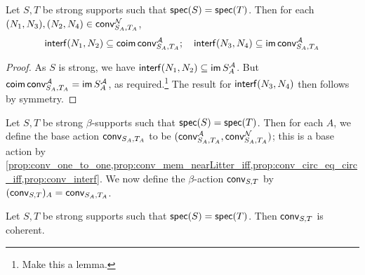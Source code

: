 \begin{proposition}
  \label{prop:conv_interf}
  Let \( S, T \) be strong supports such that \( \operatorname{\mathsf{spec}}(S) = \operatorname{\mathsf{spec}}(T) \).
  Then for each \( (N_1, N_3), (N_2, N_4) \in \operatorname{\mathsf{conv}}_{S_A, T_A}^{\mathcal N} \),
  \[ \operatorname{\mathsf{interf}}(N_1, N_2) \subseteq \operatorname{\mathsf{coim}} \operatorname{\mathsf{conv}}_{S_A, T_A}^{\mathcal A};\quad \operatorname{\mathsf{interf}}(N_3, N_4) \subseteq \operatorname{\mathsf{im}} \operatorname{\mathsf{conv}}_{S_A, T_A}^{\mathcal A} \]
\end{proposition}
\begin{proof}
  As \( S \) is strong, we have \( \operatorname{\mathsf{interf}}(N_1, N_2) \subseteq \operatorname{\mathsf{im}} S_A^{\mathcal A} \).
  But \( \operatorname{\mathsf{coim}} \operatorname{\mathsf{conv}}_{S_A, T_A}^{\mathcal A} = \operatorname{\mathsf{im}} S_A^{\mathcal A} \), as required.\footnote{Make this a lemma.}
  The result for \( \operatorname{\mathsf{interf}}(N_3, N_4) \) then follows by symmetry.
\end{proof}
\begin{definition}
  \label{def:conv}
  Let \( S, T \) be strong \( \beta \)-supports such that \( \operatorname{\mathsf{spec}}(S) = \operatorname{\mathsf{spec}}(T) \).
  Then for each \( A \), we define the base action \( \operatorname{\mathsf{conv}}_{S_A, T_A} \) to be \( (\operatorname{\mathsf{conv}}_{S_A, T_A}^{\mathcal A}, \operatorname{\mathsf{conv}}_{S_A, T_A}^{\mathcal N}) \); this is a base action by \cref{prop:conv_one_to_one,prop:conv_mem_nearLitter_iff,prop:conv_circ_eq_circ_iff,prop:conv_interf}.
  We now define the \( \beta \)-action \( \operatorname{\mathsf{conv}}_{S,T} \) by \( (\operatorname{\mathsf{conv}}_{S,T})_A = \operatorname{\mathsf{conv}}_{S_A,T_A} \).
\end{definition}
\begin{proposition}
  \label{prop:conv_coherent}
  Let \( S, T \) be strong supports such that \( \operatorname{\mathsf{spec}}(S) = \operatorname{\mathsf{spec}}(T) \).
  Then \( \operatorname{\mathsf{conv}}_{S,T} \) is coherent.
\end{proposition}
